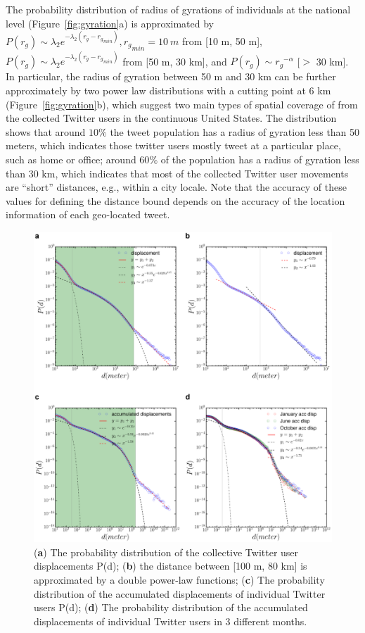 \documentclass[ijgi,article,accept,moreauthors,pdftex,10pt,a4paper]{mdpi}
\theoremstyle{mdpi}
\newcounter{re}
\theoremstyle{mdpidefinition}
\begin{document}
The probability distribution of radius of gyrations of individuals at the national level (Figure~\ref{fig:gyration}a) is approximated by $P(r_{g}) \sim \lambda_{2} e^{-\lambda_{2}(r_{g} - {r_{g}}_{min})}, {r_{g}}_{min}=10~m$ from [10 m, 50 m], $P(r_{g}) \sim \lambda_{2} e^{-\lambda_{2}(r_{g} - {r_{g}}_{min})}$ from [50 m, 30 km], and $P(r_{g}) \sim {r_{g}}^{-\alpha}$ [$>$ 30 km].
In particular, the radius of gyration between 50 m and 30 km can be further approximately by two power law distributions with a cutting point at 6 km (Figure~\ref{fig:gyration}b), which suggest two main types of spatial coverage of from the collected Twitter users in the continuous United States.
The distribution shows that around $10\%$ the tweet population has a radius of gyration less than 50 meters, which indicates those twitter users mostly tweet at a particular place, such as home or office;  around 60$\%$ of the population has a radius of gyration less than 30 km, which indicates that most of the collected Twitter user movements are ``short'' distances, e.g., within a city locale. Note that the accuracy of these values for defining the distance bound depends on the accuracy of the location information of each geo-located tweet.

\begin{figure}[ht]
\centering
\includegraphics[width=1.0\linewidth]{./figures/displacement}
\caption{({\bf a}) The probability distribution of the collective Twitter user displacements P(d); ({\bf b}) the distance between [100 m, 80 km] is approximated by a double power-law functions; ({\bf c}) The probability distribution of the accumulated displacements of individual Twitter users P(d); ({\bf d}) The probability distribution of the accumulated displacements of individual Twitter users in 3 different months.}

\label{fig:displacement}
\end{figure}
\FloatBarrier
\end{document}
